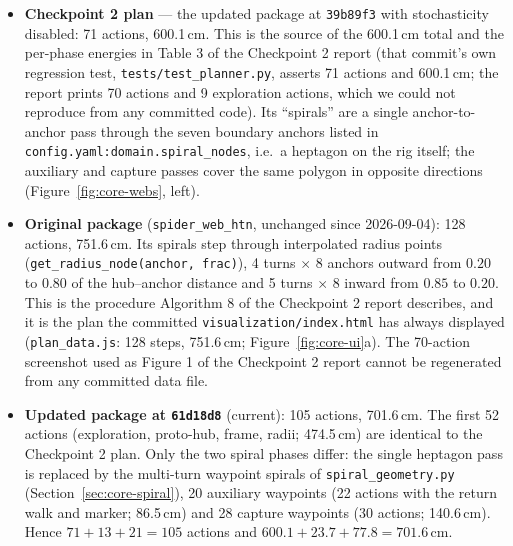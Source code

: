 \begin{itemize}
  \item \textbf{Checkpoint 2 plan} --- the updated package at \texttt{39b89f3} with stochasticity
  disabled: 71 actions, 600.1\,cm. This is the source of the 600.1\,cm total and the per-phase energies
  in Table 3 of the Checkpoint 2 report (that commit's own regression test,
  \texttt{tests/test\_planner.py}, asserts 71 actions and 600.1\,cm; the report prints 70 actions and 9
  exploration actions, which we could not reproduce from any committed code). Its ``spirals'' are a
  single anchor-to-anchor pass through the seven boundary anchors listed in
  \texttt{config.yaml:domain.spiral\_nodes}, i.e.\ a heptagon on the rig itself; the auxiliary and
  capture passes cover the same polygon in opposite directions (Figure~\ref{fig:core-webs}, left).
  \item \textbf{Original package} (\texttt{spider\_web\_htn}, unchanged since 2026-09-04): 128 actions,
  751.6\,cm. Its spirals step through interpolated radius points
  (\texttt{get\_radius\_node(anchor, frac)}), 4 turns $\times$ 8 anchors outward from $0.20$ to $0.80$ of
  the hub--anchor distance and 5 turns $\times$ 8 inward from $0.85$ to $0.20$. This is the procedure
  Algorithm 8 of the Checkpoint 2 report describes, and it is the plan the committed
  \texttt{visualization/index.html} has always displayed (\texttt{plan\_data.js}: 128 steps,
  751.6\,cm; Figure~\ref{fig:core-ui}a). The 70-action screenshot used as Figure 1 of the Checkpoint 2
  report cannot be regenerated from any committed data file.
  \item \textbf{Updated package at \texttt{61d18d8}} (current): 105 actions, 701.6\,cm. The first 52
  actions (exploration, proto-hub, frame, radii; 474.5\,cm) are identical to the Checkpoint 2 plan. Only
  the two spiral phases differ: the single heptagon pass is replaced by the multi-turn waypoint spirals of
  \texttt{spiral\_geometry.py} (Section~\ref{sec:core-spiral}), 20 auxiliary waypoints (22 actions with
  the return walk and marker; 86.5\,cm) and 28 capture waypoints (30 actions; 140.6\,cm). Hence
  $71 + 13 + 21 = 105$ actions and $600.1 + 23.7 + 77.8 = 701.6$\,cm.
\end{itemize}

